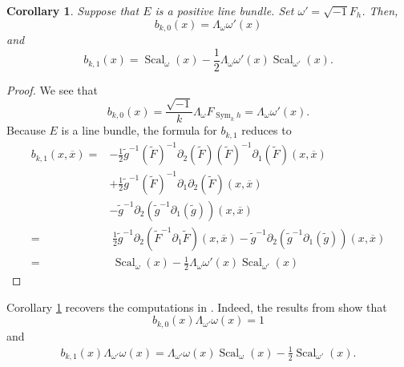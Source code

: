 \documentclass{amsart}
\newtheorem{cor}[thm]{Corollary}
\theoremstyle{definition}
\theoremstyle{remark}
\numberwithin{equation}{section}
\DeclareMathOperator{\Sym}{Sym}
\DeclareMathOperator{\Scal}{Scal}
\begin{document}
\begin{cor} \label{cor: line bundle computation}
Suppose that $E$ is a positive line bundle. Set $\omega' = \sqrt{-1} F_h$. Then,
\begin{equation*}
b_{k,0}(x) = \Lambda_\omega \omega' (x)
\end{equation*}
and
\begin{equation*}
b_{k,1}(x) =  \Scal_\omega (x) - \frac{1}{2} \Lambda_\omega \omega' (x) \Scal_{\omega'} (x).
\end{equation*}
\end{cor}
\begin{proof}
We see that 
$$
b_{k,0}(x) = \frac{\sqrt{-1}}{k} \Lambda_\omega F_{\Sym_k h} = \Lambda_\omega \omega' (x).
$$
Because $E$ is a line bundle, the formula for $b_{k,1}$ reduces to
\begin{equation*}
\begin{split}
b_{k,1}(x,\overline{x}) = & - \frac{1}{2} \tilde{g}^{-1}  (\tilde{F})^{-1} \partial_2 (\tilde{F})(\tilde{F})^{-1}  \partial_1 (\tilde{F})   (x,\overline{x})\\
    & + \frac{1}{2} \tilde{g}^{-1}  (\tilde{F})^{-1}  \partial_1\partial_2 (\tilde{F})   (x,\overline{x}) \\
    & - \tilde{g}^{-1} \partial_2 (\tilde{g}^{-1} \partial_1 (\tilde{g}))(x,\overline{x}) \\
    = & \hspace{3pt} \frac{1}{2}{\tilde{g}}^{-1} \partial_2 \left ( {\tilde{F}}^{-1} \partial_1 \tilde{F}\right ) (x,\overline{x}) - \tilde{g}^{-1} \partial_2 (\tilde{g}^{-1} \partial_1 (\tilde{g}))(x,\overline{x}) \\
    = & \hspace{3pt} \Scal_\omega (x) - \frac{1}{2} \Lambda_\omega \omega' (x) \Scal_{\omega'} (x)
\end{split}
\end{equation*}


\end{proof}

Corollary \ref{cor: line bundle computation} recovers the computations in \cite{BBS}. Indeed, the results from \cite{BBS} show that
$$
b_{k,0}(x) \Lambda_{\omega'}\omega(x) = 1
$$
and
\begin{align*}
b_{k,1}(x) \Lambda_{\omega'}\omega(x)  = \Lambda_{\omega'}\omega(x) \Scal_\omega(x) - \frac{1}{2} \Scal_{\omega'}(x). 
\end{align*}
\end{document}
